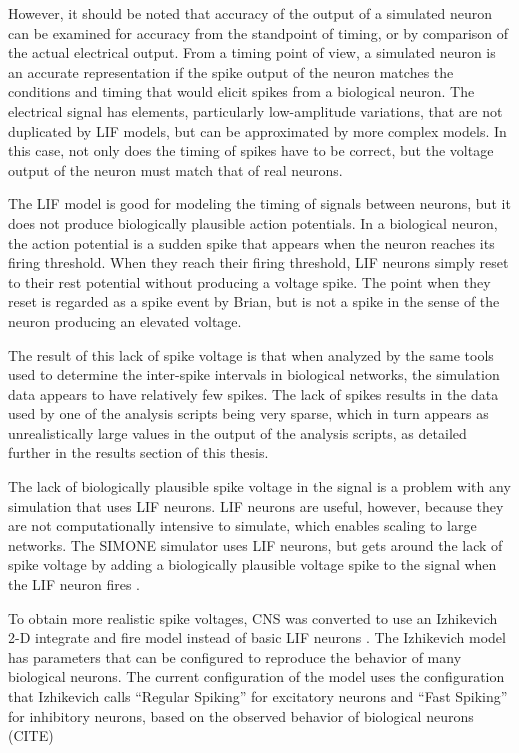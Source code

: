 \documentclass[letterpaper]{article}
\begin{document}
However, it should be noted that accuracy of the output of a simulated neuron can be examined for accuracy from the standpoint of timing, or by comparison of the actual electrical output. 
From a timing point of view, a simulated neuron is an accurate representation if the spike output of the neuron matches the conditions and timing that would elicit spikes from a biological neuron. 
The electrical signal has elements, particularly low-amplitude variations, that are not duplicated by LIF models, but can be approximated by more complex models. In this case, not only does the timing of spikes have to be correct, but the voltage output of the neuron must match that of real neurons. 

The LIF model is good for modeling the timing of signals between neurons, but it does not produce biologically plausible action potentials. 
In a biological neuron, the action potential is a sudden spike that appears when the neuron reaches its firing threshold. 
When they reach their firing threshold, LIF neurons simply reset to their rest potential without producing a voltage spike.
The point when they reset is regarded as a spike event by Brian, but is not a spike in the sense of the neuron producing an elevated voltage. 

The result of this lack of spike voltage is that when analyzed by the same tools used to determine the inter-spike intervals in biological networks, the simulation data appears to have relatively few spikes. 
The lack of spikes results in the data used by one of the analysis scripts being very sparse, which in turn appears as unrealistically large values in the output of the analysis scripts, as detailed further in the results section of this thesis. 

The lack of biologically plausible spike voltage in the signal is a problem with any simulation that uses LIF neurons.
LIF neurons are useful, however, because they are not computationally intensive to simulate, which enables scaling to large networks. 
The SIMONE simulator uses LIF neurons, but gets around the lack of spike voltage by adding a biologically plausible voltage spike to the signal when the LIF neuron fires \cite{escola2008simone}.

To obtain more realistic spike voltages, CNS was converted to use an Izhikevich 2-D integrate and fire model instead of basic LIF neurons \cite{izhikevich2003simple}.
The Izhikevich model has parameters that can be configured to reproduce the behavior of many biological neurons. 
The current configuration of the model uses the configuration that Izhikevich calls ``Regular Spiking'' for excitatory neurons and ``Fast Spiking'' for inhibitory neurons, based on the observed behavior of biological neurons (CITE)
\end{document}
